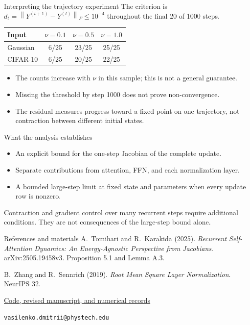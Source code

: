 \documentclass[aspectratio=169,11pt]{beamer}
\newcommand{\norm}[1]{\left\|#1\right\|}
\begin{document}
\begin{frame}{Interpreting the trajectory experiment}
The criterion is $d_t=\norm{Y^{(t+1)}-Y^{(t)}}_F\leq10^{-4}$
throughout the final 20 of 1000 steps.
\begin{center}
\begin{tabular}{lccc}
\toprule
Input & $\nu=0.1$ & $\nu=0.5$ & $\nu=1.0$\\
\midrule
Gaussian & 6/25 & 23/25 & 25/25\\
CIFAR-10 & 6/25 & 20/25 & 22/25\\
\bottomrule
\end{tabular}
\end{center}
\begin{itemize}
\item The counts increase with $\nu$ in this sample; this is not a general guarantee.
\item Missing the threshold by step 1000 does not prove non-convergence.
\item The residual measures progress toward a fixed point on one trajectory,
not contraction between different initial states.
\end{itemize}
\end{frame}

\begin{frame}{What the analysis establishes}
\begin{itemize}
\item An explicit bound for the one-step Jacobian of the complete update.
\item Separate contributions from attention, FFN, and each normalization layer.
\item A bounded large-step limit at fixed state and parameters when every
update row is nonzero.
\end{itemize}
\vspace{1em}
Contraction and gradient control over many recurrent steps require additional
conditions. They are not consequences of the large-step bound alone.
\end{frame}

\begin{frame}{References and materials}
\small
A.~Tomihari and R.~Karakida (2025).
\emph{Recurrent Self-Attention Dynamics: An Energy-Agnostic Perspective from
Jacobians}. arXiv:2505.19458v3. Proposition 5.1 and Lemma A.3.
\vspace{1em}

B.~Zhang and R.~Sennrich (2019).
\emph{Root Mean Square Layer Normalization}. NeurIPS 32.
\vspace{1.5em}

\href{https://github.com/Dimundel/Jacobian-Analysis-of-a-Recurrent-Transformer-Block}{Code, revised manuscript, and numerical records}
\vspace{1em}

\texttt{vasilenko.dmitrii@phystech.edu}
\end{frame}
\end{document}
